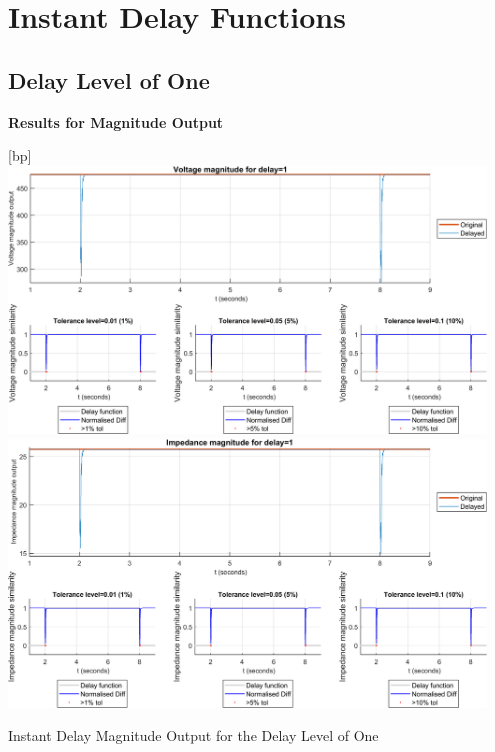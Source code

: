 {\section{Instant Delay Functions}
\newpage \subsection{Delay Level of One}
\textbf{Results for Magnitude Output}
\begin{floatingfigure}[p]{\textwidth}[bp]
    \includegraphics[width=0.95\textwidth]{PMUsim-figures/DelayOf_1/Instant_vMagnitude.png}    
      \includegraphics[width=0.95\textwidth]{PMUsim-figures/DelayOf_1/Instant_iMagnitude.png}      
    \label{fig:PMUsim_One_Magnitude}
    \caption{Instant Delay Magnitude Output for the Delay Level of One}
\end{floatingfigure}

}
